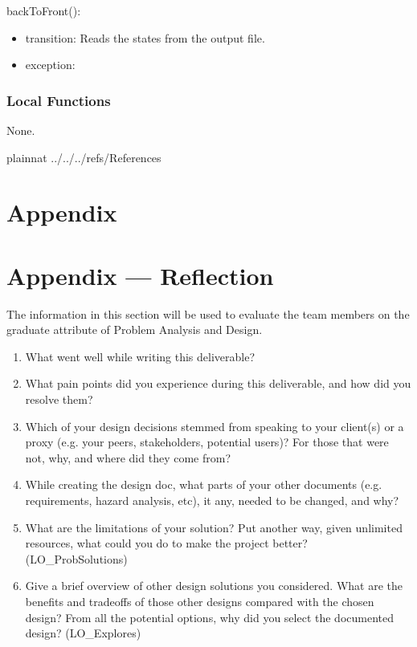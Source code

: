 \documentclass[12pt, titlepage]{article}
\begin{document}
\noindent backToFront():
\begin{itemize}
  \item transition: Reads the states from the output file.
  \item exception: 
\end{itemize}

\subsubsection{Local Functions}

None.

\newpage

 {plainnat}
 {../../../refs/References}

\newpage

\section{Appendix} \label{Appendix}


\newpage{}

\section*{Appendix --- Reflection}


The information in this section will be used to evaluate the team members on the
graduate attribute of Problem Analysis and Design.



\begin{enumerate}
  \item What went well while writing this deliverable? 
  \item What pain points did you experience during this deliverable, and how
    did you resolve them?
  \item Which of your design decisions stemmed from speaking to your client(s)
  or a proxy (e.g. your peers, stakeholders, potential users)? For those that
  were not, why, and where did they come from?
  \item While creating the design doc, what parts of your other documents (e.g.
  requirements, hazard analysis, etc), it any, needed to be changed, and why?
  \item What are the limitations of your solution?  Put another way, given
  unlimited resources, what could you do to make the project better? (LO\_ProbSolutions)
  \item Give a brief overview of other design solutions you considered.  What
  are the benefits and tradeoffs of those other designs compared with the chosen
  design?  From all the potential options, why did you select the documented design?
  (LO\_Explores)
\end{enumerate}
\end{document}
